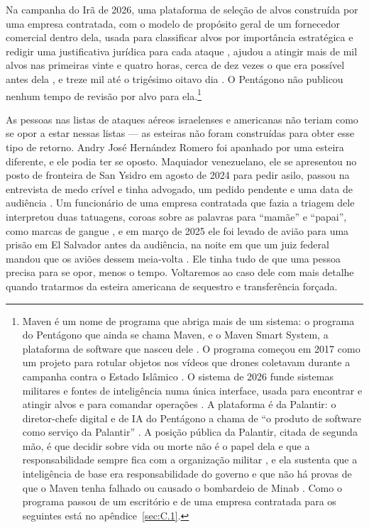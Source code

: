 Na campanha do Irã de 2026, uma plataforma de seleção de alvos construída por uma empresa contratada, com o modelo de propósito geral de um fornecedor comercial dentro dela, usada para classificar alvos por importância estratégica e redigir uma justificativa jurídica para cada ataque \autocite{livingstone2026maven}, ajudou a atingir mais de mil alvos nas primeiras vinte e quatro horas, cerca de dez vezes o que era possível antes dela \autocite{csis2026maven}, e treze mil até o trigésimo oitavo dia \autocite{breakingdefense2026maven}. O Pentágono não publicou nenhum tempo de revisão por alvo para ela.\footnote{Maven é um nome de programa que abriga mais de um sistema: o programa do Pentágono que ainda se chama Maven, e o Maven Smart System, a plataforma de software que nasceu dele \autocite{csis2026maven}. O programa começou em 2017 como um projeto para rotular objetos nos vídeos que drones coletavam durante a campanha contra o Estado Islâmico \autocite{weisgerber2017maven,fang2019maven}. O sistema de 2026 funde sistemas militares e fontes de inteligência numa única interface, usada para encontrar e atingir alvos e para comandar operações \autocite{defensescoop2026transition}. A plataforma é da Palantir: o diretor-chefe digital e de IA do Pentágono a chama de “o produto de software como serviço da Palantir” \autocite{defensescoop2026transition}. A posição pública da Palantir, citada de segunda mão, é que decidir sobre vida ou morte não é o papel dela e que a responsabilidade sempre fica com a organização militar \autocite{lee2026palantir}, e ela sustenta que a inteligência de base era responsabilidade do governo e que não há provas de que o Maven tenha falhado ou causado o bombardeio de Minab \autocite{Bloomberg2026KillChain}. Como o programa passou de um escritório e de uma empresa contratada para os seguintes está no apêndice~\ref{sec:C.1}.}

As pessoas nas listas de ataques aéreos israelenses e americanas não teriam como se opor a estar nessas listas — as esteiras não foram construídas para obter esse tipo de retorno. Andry José Hernández Romero foi apanhado por uma esteira diferente, e ele podia ter se oposto. Maquiador venezuelano, ele se apresentou no posto de fronteira de San Ysidro em agosto de 2024 para pedir asilo, passou na entrevista de medo crível e tinha advogado, um pedido pendente e uma data de audiência \autocite{LULAC2025HernandezRomero,Vega2025HernandezRomero}. Um funcionário de uma empresa contratada que fazia a triagem dele interpretou duas tatuagens, coroas sobre as palavras para “mamãe” e “papai”, como marcas de gangue \autocite{Palomera2025Blade}, e em março de 2025 ele foi levado de avião para uma prisão em El Salvador antes da audiência, na noite em que um juiz federal mandou que os aviões dessem meia-volta \autocite{jgg2025contempt}. Ele tinha tudo de que uma pessoa precisa para se opor, menos o tempo. Voltaremos ao caso dele com mais detalhe quando tratarmos da esteira americana de sequestro e transferência forçada.

